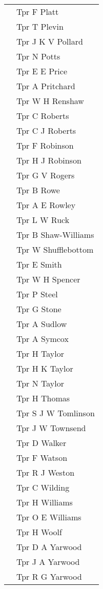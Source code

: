 \begin{center}
\begin{tabular}{rl}
    & Tpr F Platt \\
    & Tpr T Plevin \\
    & Tpr J K V Pollard \\
    & Tpr N Potts \\
    & Tpr E E Price \\
    & Tpr A Pritchard \\
    & Tpr W H Renshaw \\
    & Tpr C Roberts \\
    & Tpr C J Roberts \\
    & Tpr F Robinson \\
    & Tpr H J Robinson \\
    & Tpr G V Rogers \\
    & Tpr B Rowe \\
    & Tpr A E Rowley \\
    & Tpr L W Ruck \\
    & Tpr B Shaw-Williams \\
    & Tpr W Shufflebottom \\
    & Tpr E Smith \\
    & Tpr W H Spencer \\
    & Tpr P Steel \\
    & Tpr G Stone \\
    & Tpr A Sudlow \\
    & Tpr A Symcox \\
    & Tpr H Taylor \\
    & Tpr H K Taylor \\
    & Tpr N Taylor \\
    & Tpr H Thomas \\
    & Tpr S J W Tomlinson \\
    & Tpr J W Townsend \\
    & Tpr D Walker \\
    & Tpr F Watson \\
    & Tpr R J Weston \\
    & Tpr C Wilding \\
    & Tpr H Williams \\
    & Tpr O E Williams \\
    & Tpr H Woolf \\
    & Tpr D A Yarwood \\
    & Tpr J A Yarwood \\
    & Tpr R G Yarwood \\
  \end{tabular}
\end{center}

